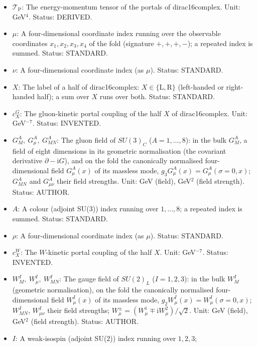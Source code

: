 \documentclass[
  10pt,
]{article}
\providecommand{\tightlist}{%
  \setlength{\itemsep}{0pt}\setlength{\parskip}{0pt}}
\begin{document}
\begin{itemize}
\tightlist
\item
  \(\mathcal{T}_{\mathrm{P}}\): The energy-momentum tensor of the
  portals of dirac16complex. Unit: GeV\(^4\). Status: DERIVED.
\item
  \(\mu\): A four-dimensional coordinate index running over the
  observable coordinates \(x_1, x_2, x_3, x_4\) of the fold (signature
  \(+,+,+,-\)); a repeated index is summed. Status: STANDARD.
\item
  \(\nu\): A four-dimensional coordinate index (as \(\mu\)). Status:
  STANDARD.
\item
  \(X\): The label of a half of dirac16complex:
  \(X \in \{\mathrm{L}, \mathrm{R}\}\) (left-handed or right-handed
  half); a sum over \(X\) runs over both. Status: STANDARD.
\item
  \(c^{G}_X\): The gluon-kinetic portal coupling of the half \(X\) of
  dirac16complex. Unit: GeV\(^{-7}\). Status: INVENTED.
\item
  \(G^A_M,\ G^A_\mu,\ G^A_{MN}\): The gluon field of \(SU(3)_C\)
  (\(A = 1, \dots, 8\)): in the bulk \(G^A_M\), a field of eight
  dimensions in its geometric normalisation (the covariant derivative
  \(\partial - \mathrm{i}G\)), and on the fold the canonically
  normalised four-dimensional field \(G^A_\mu(x)\) of its massless mode,
  \(g_3G^A_\mu(x) = G^A_\mu(\sigma = 0, x)\); \(G^A_{MN}\) and
  \(G^A_{\mu\nu}\) their field strengths. Unit: GeV (field), GeV\(^2\)
  (field strength). Status: AUTHOR.
\item
  \(A\): A colour (adjoint SU(3)) index running over \(1, \dots, 8\); a
  repeated index is summed. Status: STANDARD.
\item
  \(\rho\): A four-dimensional coordinate index (as \(\mu\)). Status:
  STANDARD.
\item
  \(c^{W}_X\): The \(W\)-kinetic portal coupling of the half \(X\).
  Unit: GeV\(^{-7}\). Status: INVENTED.
\item
  \(W^I_M,\ W^I_\mu,\ W^I_{MN}\): The gauge field of \(SU(2)_L\)
  (\(I = 1, 2, 3\)): in the bulk \(W^I_M\) (geometric normalisation), on
  the fold the canonically normalised four-dimensional field
  \(W^I_\mu(x)\) of its massless mode,
  \(g_2W^I_\mu(x) = W^I_\mu(\sigma = 0, x)\); \(W^I_{MN}\),
  \(W^I_{\mu\nu}\) their field strengths;
  \(W^\pm_\mu = (W^1_\mu \mp \mathrm{i}W^2_\mu)/\sqrt2\). Unit: GeV
  (field), GeV\(^2\) (field strength). Status: AUTHOR.
\item
  \(I\): A weak-isospin (adjoint SU(2)) index running over \(1, 2, 3\);

\end{itemize}
\end{document}
